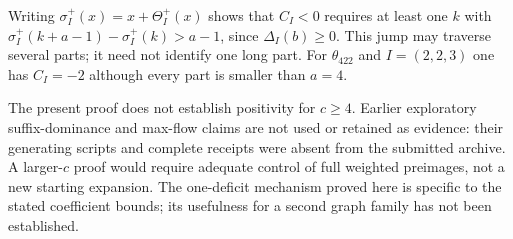 \documentclass[11pt]{article}
\theoremstyle{remark}
\theoremstyle{definition}
\newcommand{\Tp}{\Theta^{+}}
\begin{document}
Writing $\sigma_I^+(x)=x+\Tp_I(x)$ shows that $C_I<0$ requires at least one $k$ with
$\sigma_I^+(k+a-1)-\sigma_I^+(k)>a-1$, since $\Delta_I(b)\ge0$. This jump may traverse several parts; it need not identify one long part. For $\theta_{422}$ and $I=(2,2,3)$ one has $C_I=-2$ although every part is smaller than $a=4$.

The present proof does not establish positivity for $c\ge4$. Earlier exploratory suffix-dominance and max-flow claims are not used or retained as evidence: their generating scripts and complete receipts were absent from the submitted archive. A larger-$c$ proof would require adequate control of full weighted preimages, not a new starting expansion. The one-deficit mechanism proved here is specific to the stated coefficient bounds; its usefulness for a second graph family has not been established.



\end{document}
